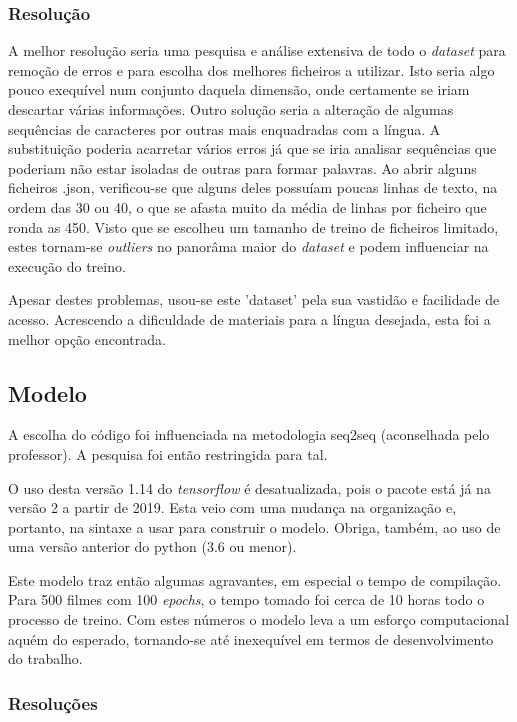 \documentclass{article}
\begin{document}
\subsubsection{Resolução}
A melhor resolução seria uma pesquisa e análise extensiva de todo o \textit{dataset} para remoção de erros e para escolha dos melhores ficheiros a utilizar. Isto seria algo pouco exequível num conjunto daquela dimensão, onde certamente se iriam descartar várias informações. Outro solução seria a alteração de algumas sequências de caracteres por outras mais enquadradas com a língua. A substituição poderia acarretar vários erros já que se iria analisar sequências que poderiam não estar isoladas de outras para formar palavras. Ao abrir alguns ficheiros .json, verificou-se que alguns deles possuíam poucas linhas de texto, na ordem das 30 ou 40, o que se afasta muito da média de linhas por ficheiro que ronda as 450. Visto que se escolheu um tamanho de treino de ficheiros limitado, estes tornam-se \textit{outliers} no panorâma maior do \textit{dataset} e podem influenciar na execução do treino. 

Apesar destes problemas, usou-se este 'dataset' pela sua vastidão e facilidade de acesso. Acrescendo a dificuldade de materiais para a língua desejada, esta foi a melhor opção encontrada.

\subsection{Modelo}
A escolha do código foi influenciada na metodologia seq2seq (aconselhada pelo professor). A pesquisa foi então restringida para tal.

O uso desta versão 1.14 do \textit{tensorflow} é desatualizada, pois o pacote está já na versão 2 a partir de 2019. Esta veio com uma mudança na organização e, portanto, na sintaxe a usar para construir o modelo. Obriga, também, ao uso de uma versão anterior do python (3.6 ou menor). 

Este modelo traz então algumas agravantes, em especial o tempo de compilação. Para 500 filmes com 100 \textit{epochs}, o tempo tomado foi cerca de 10 horas todo o processo de treino. Com estes números o modelo leva a um esforço computacional aquém do esperado, tornando-se até inexequível em termos de desenvolvimento do trabalho.

\subsubsection{Resoluções}
\end{document}
